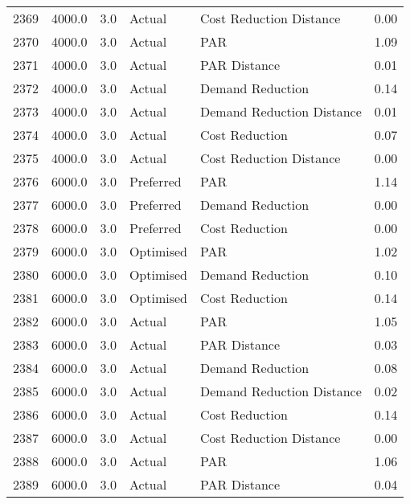 \begin{longtable}{lrrllr}
2369 &       4000.0 &     3.0 &         Actual &    Cost Reduction Distance &   0.00 \\
2370 &       4000.0 &     3.0 &         Actual &                        PAR &   1.09 \\
2371 &       4000.0 &     3.0 &         Actual &               PAR Distance &   0.01 \\
2372 &       4000.0 &     3.0 &         Actual &           Demand Reduction &   0.14 \\
2373 &       4000.0 &     3.0 &         Actual &  Demand Reduction Distance &   0.01 \\
2374 &       4000.0 &     3.0 &         Actual &             Cost Reduction &   0.07 \\
2375 &       4000.0 &     3.0 &         Actual &    Cost Reduction Distance &   0.00 \\
2376 &       6000.0 &     3.0 &      Preferred &                        PAR &   1.14 \\
2377 &       6000.0 &     3.0 &      Preferred &           Demand Reduction &   0.00 \\
2378 &       6000.0 &     3.0 &      Preferred &             Cost Reduction &   0.00 \\
2379 &       6000.0 &     3.0 &      Optimised &                        PAR &   1.02 \\
2380 &       6000.0 &     3.0 &      Optimised &           Demand Reduction &   0.10 \\
2381 &       6000.0 &     3.0 &      Optimised &             Cost Reduction &   0.14 \\
2382 &       6000.0 &     3.0 &         Actual &                        PAR &   1.05 \\
2383 &       6000.0 &     3.0 &         Actual &               PAR Distance &   0.03 \\
2384 &       6000.0 &     3.0 &         Actual &           Demand Reduction &   0.08 \\
2385 &       6000.0 &     3.0 &         Actual &  Demand Reduction Distance &   0.02 \\
2386 &       6000.0 &     3.0 &         Actual &             Cost Reduction &   0.14 \\
2387 &       6000.0 &     3.0 &         Actual &    Cost Reduction Distance &   0.00 \\
2388 &       6000.0 &     3.0 &         Actual &                        PAR &   1.06 \\
2389 &       6000.0 &     3.0 &         Actual &               PAR Distance &   0.04 \\

\end{longtable}
